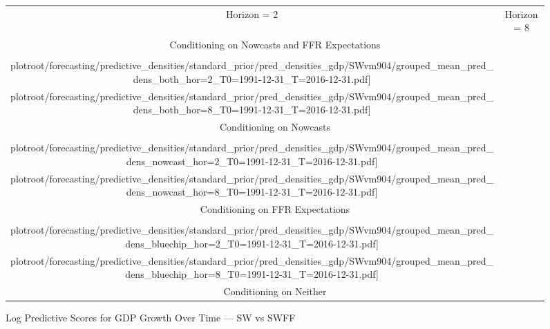 \documentclass[12pt]{article}
\theoremstyle{definition}
\newcommand\plotroot{../figures_for_paper}
\begin{document}
\begin{figure}[h!]
    \caption{Log Predictive Scores for GDP Growth Over Time --- SW vs SWFF}
    \label{fig:GDPpredictive_densities_over_time}
    \vspace*{-0.75cm}
    \begin{center}
        \begin{tabular}{@{\hspace*{-.4cm}}cc}
            Horizon = 2 & Horizon = 8 \\[-.5ex]
            \multicolumn{2}{c}{Conditioning on Nowcasts and FFR Expectations} \\[-.5ex]
            \texttt{[image: \\plotroot/forecasting/predictive\_densities/standard\_prior/pred\_densities\_gdp/SWvm904/grouped\_mean\_pred\_dens\_both\_hor=2\_T0=1991-12-31\_T=2016-12-31.pdf]} &
            \texttt{[image: \\plotroot/forecasting/predictive\_densities/standard\_prior/pred\_densities\_gdp/SWvm904/grouped\_mean\_pred\_dens\_both\_hor=8\_T0=1991-12-31\_T=2016-12-31.pdf]} \\[-.5ex]
            \multicolumn{2}{c}{Conditioning on Nowcasts} \\[-.5ex]
            \texttt{[image: \\plotroot/forecasting/predictive\_densities/standard\_prior/pred\_densities\_gdp/SWvm904/grouped\_mean\_pred\_dens\_nowcast\_hor=2\_T0=1991-12-31\_T=2016-12-31.pdf]} &
            \texttt{[image: \\plotroot/forecasting/predictive\_densities/standard\_prior/pred\_densities\_gdp/SWvm904/grouped\_mean\_pred\_dens\_nowcast\_hor=8\_T0=1991-12-31\_T=2016-12-31.pdf]} \\[-.5ex]
            \multicolumn{2}{c}{Conditioning on FFR Expectations} \\[-.5ex]
            \texttt{[image: \\plotroot/forecasting/predictive\_densities/standard\_prior/pred\_densities\_gdp/SWvm904/grouped\_mean\_pred\_dens\_bluechip\_hor=2\_T0=1991-12-31\_T=2016-12-31.pdf]} &
            \texttt{[image: \\plotroot/forecasting/predictive\_densities/standard\_prior/pred\_densities\_gdp/SWvm904/grouped\_mean\_pred\_dens\_bluechip\_hor=8\_T0=1991-12-31\_T=2016-12-31.pdf]} \\[-.5ex]
            \multicolumn{2}{c}{Conditioning on Neither} \\[-.5ex]

\end{tabular}
\end{center}
\end{figure}
\end{document}
